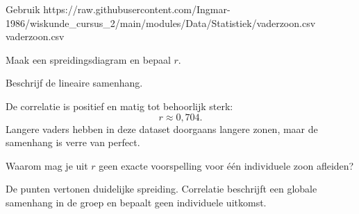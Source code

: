 \documentclass{ximera}
\begin{document}
\begin{oefening}{\oefU}

Gebruik \csv
{https://raw.githubusercontent.com/Ingmar-1986/wiskunde_cursus_2/main/modules/Data/Statistiek/vaderzoon.csv}
{vaderzoon.csv}

Maak een spreidingsdiagram en bepaal $r$.

\begin{question}
Beschrijf de lineaire samenhang.

\begin{oplossing}
De correlatie is positief en matig tot behoorlijk sterk:
\[
r\approx0{,}704.
\]
Langere vaders hebben in deze dataset doorgaans langere zonen, maar
de samenhang is verre van perfect.
\end{oplossing}
\end{question}

\begin{question}
Waarom mag je uit $r$ geen exacte voorspelling voor één individuele
zoon afleiden?

\begin{oplossing}
De punten vertonen duidelijke spreiding. Correlatie beschrijft een
globale samenhang in de groep en bepaalt geen individuele uitkomst.
\end{oplossing}
\end{question}

\end{oefening}
\end{document}

